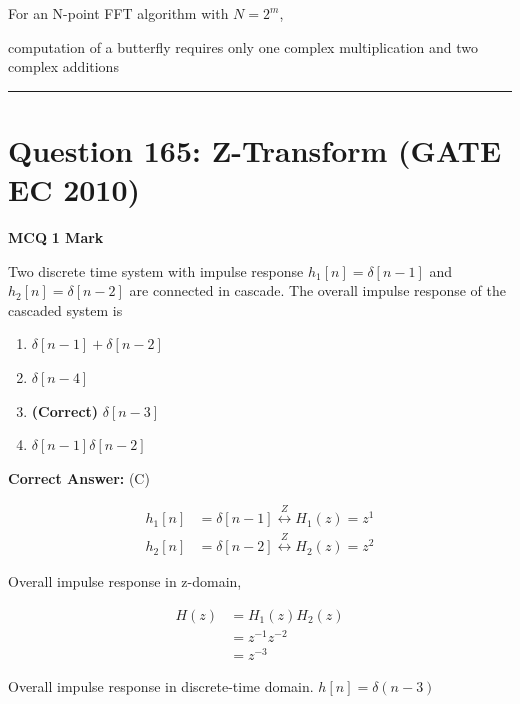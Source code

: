 \documentclass[11pt,a4paper]{article}
\begin{document}
\begin{tcolorbox}[solbox, title=Detailed Solution -- Question 164]
For an N-point FFT algorithm with $N = 2^{m}$,

computation of a butterfly requires only one
complex multiplication and two complex additions
\end{tcolorbox}

\vspace{1.5em}
\hrule
\vspace{1.5em}

\section*{Question 165: Z-Transform (GATE EC 2010)}
\noindent \textbf{\color{primary}MCQ} \hfill \textbf{\color{secondary}1 Mark}


\noindent Two discrete time system with impulse response $h_{1}[n]=\delta [n-1]$ and $h_{2}[n]=\delta [n-2]$ are connected in cascade. The overall impulse response of the cascaded system is


\begin{enumerate}[label=(\Alph*)]
    \item $\delta [n-1] +\delta [n-2]$
    \item $\delta [n-4]$
    \item \textbf{(Correct)} $\delta [n-3]$
    \item $\delta [n-1] \delta [n-2]$
\end{enumerate}

\noindent \textbf{Correct Answer:} (C)

\begin{tcolorbox}[solbox, title=Detailed Solution -- Question 165]
\[
\begin{aligned} h_{1}[n]&=\delta[n-1] \stackrel{Z}{\longleftrightarrow} H_{1}(z)=z^{1} \\ h_{2}[n]&=\delta[n-2] \stackrel{Z}{\longleftrightarrow} H_{2}(z)=z^{2} \end{aligned}
\]

 Overall impulse response in z-domain,

\[
\begin{aligned} H(z) &=H_{1}(z) H_{2}(z) \\ &=z^{-1} z^{-2} \\ &=z^{-3} \end{aligned}
\]

 Overall impulse response in discrete-time domain.
$h[n]=\delta(n-3)$
\end{tcolorbox}
\end{document}
